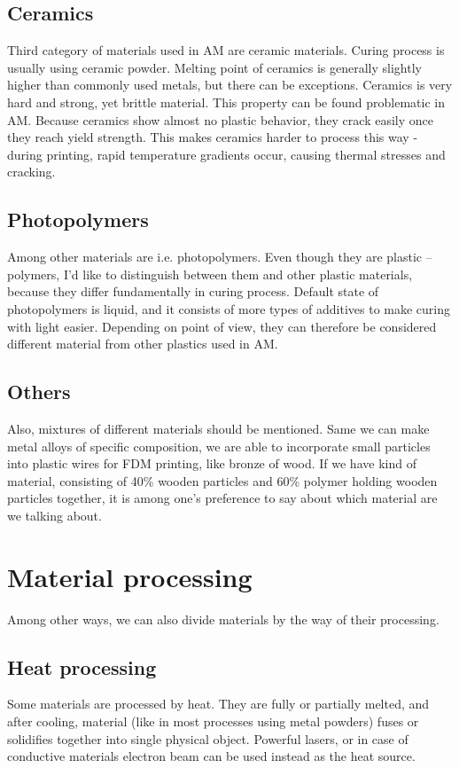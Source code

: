 \documentclass[a4paper, twoside, 11pt]{report}
\begin{document}
\subsection{Ceramics}
Third category of materials used in AM are ceramic materials. Curing process is usually using ceramic powder. Melting point of ceramics is generally slightly higher than commonly used metals, but there can be exceptions. Ceramics is very hard and strong, yet brittle material. This property can be found problematic in AM. Because ceramics show almost no plastic behavior, they crack easily once they reach yield strength. This makes ceramics harder to process this way - during printing, rapid temperature gradients occur, causing thermal stresses and cracking.
\subsection{Photopolymers}
Among other materials are i.e. photopolymers. Even though they are plastic – polymers, I'd like to distinguish between them and other plastic materials, because they differ fundamentally in curing process. Default state of photopolymers is liquid, and it consists of more types of additives to make curing with light easier. Depending on point of view, they can therefore be considered different material from other plastics used in AM.
\subsection{Others}
Also, mixtures of different materials should be mentioned. Same we can make metal alloys of specific composition, we are able to incorporate small particles into plastic wires for FDM printing, like bronze of wood. If we have kind of material, consisting of 40\% wooden particles and 60\% polymer holding wooden  particles together, it is among one’s preference to say about which material are we talking about.\cite{WoodenFilament}
\section{Material processing}
Among other ways, we can also divide materials by the way of their processing.
\subsection{Heat processing} Some materials are processed by heat. They are fully or partially melted, and after cooling, material (like in most processes using metal powders) fuses or solidifies together into single physical object. Powerful lasers, or in case of conductive materials electron beam can be used instead as the heat source.
\end{document}
